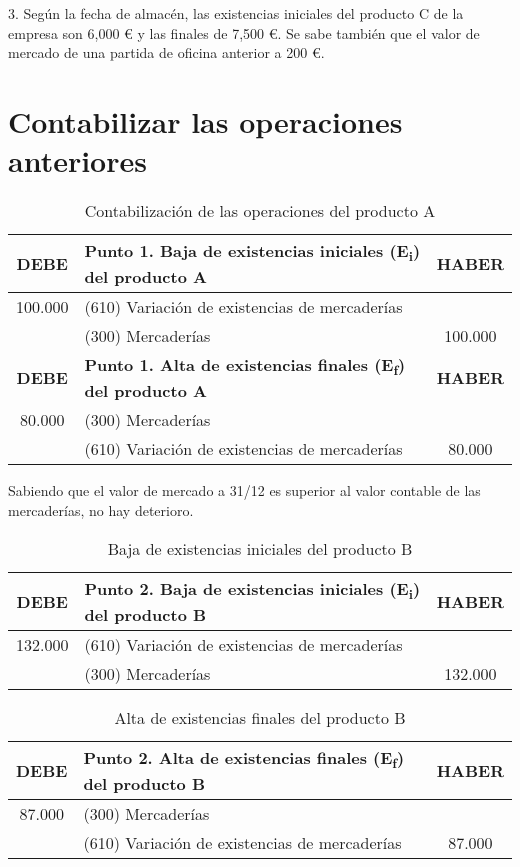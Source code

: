 \documentclass{article}
\begin{document}
3. Según la fecha de almacén, las existencias iniciales del producto C de la empresa son 6,000 € y las finales de 7,500 €. Se sabe también que el valor de mercado de una partida de oficina anterior a 200 €.

\section*{Contabilizar las operaciones anteriores}

\begin{table}[h]
\centering
\begin{tabular}{|c|l|c|}
\hline
\textbf{DEBE} & \textbf{Punto 1. Baja de existencias iniciales (E\textsubscript{i}) del producto A} & \textbf{HABER} \\
\hline
100.000 & (610) Variación de existencias de mercaderías & \\
 & \hspace{2cm} (300) Mercaderías & 100.000 \\
\hline
\textbf{DEBE} & \textbf{Punto 1. Alta de existencias finales (E\textsubscript{f}) del producto A} & \textbf{HABER} \\
\hline
80.000 & (300) Mercaderías & \\
& \hspace{2cm}(610) Variación de existencias de mercaderías & 80.000 \\
\hline
\end{tabular}
\caption{Contabilización de las operaciones del producto A}
\end{table}

Sabiendo que el valor de mercado a 31/12 es superior al valor contable de las mercaderías, no hay deterioro.

\begin{table}[H]
\centering
\begin{tabular}{|c|l|c|}
\hline
\textbf{DEBE} & \textbf{Punto 2. Baja de existencias iniciales (E\textsubscript{i}) del producto B} & \textbf{HABER} \\
\hline
132.000 & (610) Variación de existencias de mercaderías & \\
 & \hspace{2cm} (300) Mercaderías & 132.000 \\
\hline
\end{tabular}
\caption{Baja de existencias iniciales del producto B}
\end{table}

\begin{table}[H]
\centering
\begin{tabular}{|c|l|c|}
\hline
\textbf{DEBE} & \textbf{Punto 2. Alta de existencias finales (E\textsubscript{f}) del producto B} & \textbf{HABER} \\
\hline
87.000 & (300) Mercaderías & \\
 & \hspace{2cm} (610) Variación de existencias de mercaderías & 87.000 \\
\hline
\end{tabular}
\caption{Alta de existencias finales del producto B}
\end{table}
\end{document}
